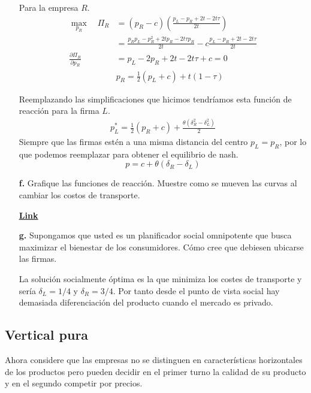 \documentclass{exam}
\begin{document}
\begin{enumerate}
\begin{solution}
Para la empresa $R$.
\begin{align*}
    \max_{p_R} \quad \Pi_R &= (p_R-c) \left( \frac{p_L-p_R +2t -2t\tau}{2t}   \right) \\
    & = \frac{p_Rp_L - p_R^2 +2tp_R-2t\tau p_R}{2t} - c \frac{p_L-p_R +2t -2t\tau}{2t} \\
    \frac{\partial \Pi_R}{\partial p_R} & = p_L -2p_R+2t-2t\tau +c = 0 \\
    & \boxed{p_R = \frac{1}{2}(p_L + c) + t(1-\tau)}
\end{align*}

Reemplazando las simplificaciones que hicimos tendríamos esta función de reacción para la firma $L$.
\begin{align*}
    p_L^* = \frac{1}{2}(p_R+c) + \frac{\theta(\delta_R^2 -\delta_L^2)}{2}
\end{align*}
Siempre que las firmas estén a una misma distancia del centro $p_L = p_R$, por lo que podemos reemplazar para obtener el equilibrio de nash. 
\begin{equation*}
    p = c + \theta(\delta_R - \delta_L)
\end{equation*}
    \end{solution}
    \item[\textbf{f.}] Grafique las funciones de reacción. Muestre como se mueven las curvas al cambiar los costos de transporte.  
    \begin{solution}
        \textbf{ \href{https://www.geogebra.org/calculator/bv9nzjae}{\underline{Link}}}
    \end{solution}
    \item[\textbf{g.}] Supongamos que usted es un planificador social omnipotente que busca maximizar el bienestar de los consumidores. Cómo cree que debiesen ubicarse las firmas.
    \begin{solution}
        La solución socialmente óptima es la que minimiza los costes de transporte y sería $\delta_L=1/4$ y $\delta_R=3/4$. Por tanto desde el punto de vista social hay demasiada diferenciación del producto cuando el mercado es privado.
    \end{solution}
\end{enumerate}

\subsection{Vertical pura}

Ahora considere que las empresas no se distinguen en características horizontales de los productos pero pueden decidir en el primer turno la calidad de su producto y en el segundo competir por precios. \vspace{3mm}
\end{document}
